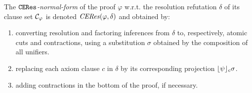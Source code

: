 \begin{definition}
The \emph{$\texttt{CERes}$-normal-form} of the proof $\varphi$ w.r.t. the resolution refutation $\delta$ of its clause set $\mathcal{C}_{\varphi}$ is denoted $\mathit{CERes}(\varphi,\delta)$ and obtained by:
\begin{enumerate}
\item converting resolution and factoring inferences from $\delta$ to, respectively, atomic cuts and contractions, using a substitution $\sigma$ obtained by the composition of all unifiers.
\item replacing each axiom clause $c$ in $\delta$ by its corresponding projection $\lfloor \psi \rfloor_{c} \sigma$.
\item adding contractions in the bottom of the proof, if necessary.
\end{enumerate} 
\end{definition}



